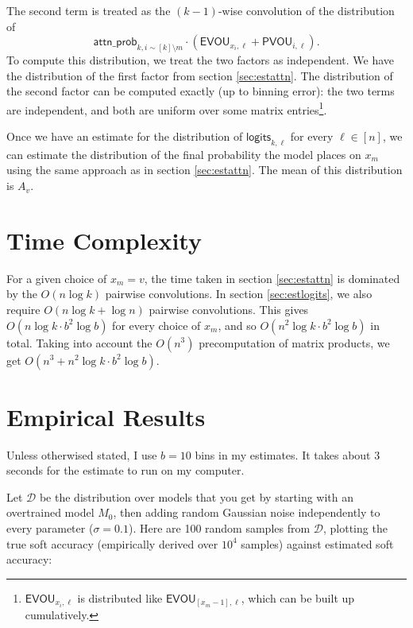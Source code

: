 \documentclass[12pt]{article}
\newcommand{\ap}{\mathsf{attn\_prob}}
\begin{document}
The second term is treated as the $(k-1)$-wise convolution of the distribution of
$$\ap_{k, i \sim [k]\setminus{m}} \cdot (\mathsf{EVOU}_{x_i, \ell} + \mathsf{PVOU}_{i,\ell}).$$
To compute this distribution, we treat the two factors as independent. We have the distribution of the first factor from section \ref{sec:estattn}. The distribution of the second factor can be computed exactly (up to binning error): the two terms are independent, and both are uniform over some matrix entries\footnote{$\mathsf{EVOU}_{x_i,\ell}$ is distributed like $\mathsf{EVOU}_{[x_m-1],\ell}$, which can be built up cumulatively.}.

Once we have an estimate for the distribution of $\mathsf{logits}_{k,\ell}$ for every $\ell \in [n]$, we can estimate the distribution of the final probability the model places on $x_m$ using the same approach as in section \ref{sec:estattn}. The mean of this distribution is $A_v$.

\section{Time Complexity}

For a given choice of $x_m = v$, the time taken in section \ref{sec:estattn} is dominated by the $O(n \log k)$ pairwise convolutions. In section \ref{sec:estlogits}, we also require $O(n \log k + \log n)$ pairwise convolutions. This gives $O(n \log k \cdot b^2 \log b)$ for every choice of $x_m$, and so $O(n^2 \log k \cdot b^2 \log b)$ in total. Taking into account the $O(n^3)$ precomputation of matrix products, we get $\boxed{O(n^3 + n^2 \log k \cdot b^2 \log b)}$.

\section{Empirical Results}

Unless otherwised stated, I use $b = 10$ bins in my estimates. It takes about 3 seconds for the estimate to run on my computer.

Let $\mathcal{D}$ be the distribution over models that you get by starting with an overtrained model $M_0$, then adding random Gaussian noise independently to every parameter ($\sigma = 0.1$). Here are 100 random samples from $\mathcal{D}$, plotting the true soft accuracy (empirically derived over $10^4$ samples) against estimated soft accuracy:
\end{document}
